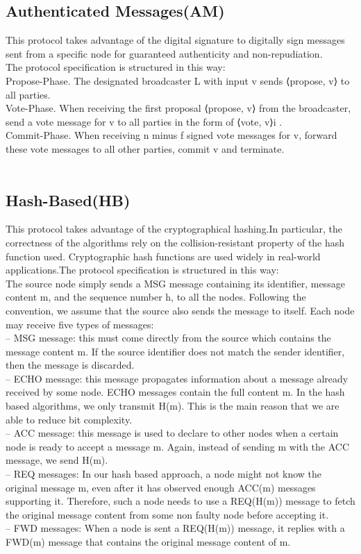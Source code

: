 \documentclass[12pt]{article}
\begin{document}
\subsection{Authenticated Messages(AM)}
This protocol takes advantage of the digital signature to digitally sign messages sent from a specific node for guaranteed authenticity and non-repudiation. \\The protocol specification is structured in this way:\\
Propose-Phase. The designated broadcaster L with input v sends ⟨propose, v⟩ to all parties.\\
Vote-Phase. When receiving the first proposal ⟨propose, v⟩ from the broadcaster, send a vote message for v to all parties in the form of ⟨vote, v⟩i .\\
Commit-Phase. When receiving n minus f signed vote messages for v, forward these vote messages to all other parties, commit v and terminate. \\
\\
\subsection{Hash-Based(HB)}
This protocol takes advantage of the cryptographical hashing.In particular, the correctness of the algorithms rely on the collision-resistant property of the hash function used. Cryptographic hash functions are used widely in real-world applications.The protocol specification is structured in this way:\\
The source node simply sends a MSG message containing its identifier, message content m, and the sequence number h, to all the nodes. Following the convention, we assume that the source also sends the message to itself. Each node may receive five types of messages: \\
– MSG message: this must come directly from the source which contains the message content m. If the source identifier does not match the sender identifier, then the message is discarded. \\
– ECHO message: this message propagates information about a message already received by some node. ECHO messages contain the full content m. In the hash based algorithms, we only transmit H(m). This is the main reason that we are able to reduce bit complexity. \\
– ACC message: this message is used to declare to other nodes when a certain node is ready to accept a message m. Again, instead of sending m with the ACC message, we send H(m). \\
– REQ messages: In our hash based approach, a node might not know the original message m, even after it has observed enough ACC(m) messages supporting it. Therefore, such a node needs to use a REQ(H(m)) message to fetch the original message content from some non faulty node before accepting it. \\
– FWD messages: When a node is sent a REQ(H(m)) message, it replies with a FWD(m) message that contains the original message content of m. \\
\\
\end{document}
